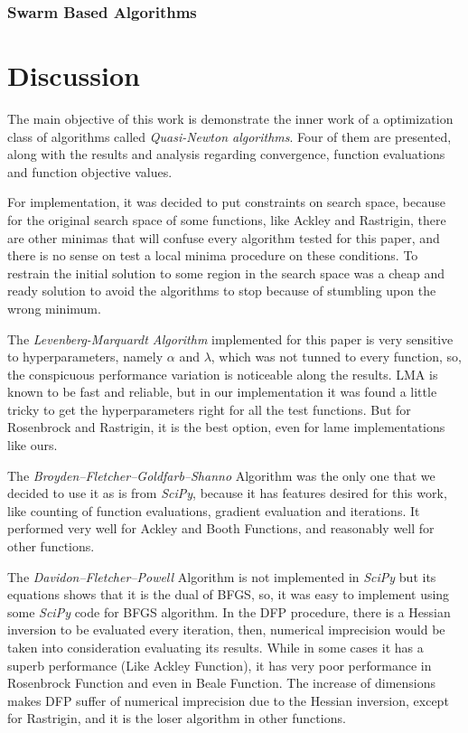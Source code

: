 \documentclass[conference]{IEEEtran}
\begin{document}
\subsubsection{Swarm Based Algorithms}

\label{subsubsec:pressure_vessel_problem_swarm_based}



\section{Discussion}

The main objective of this work is demonstrate the inner work of a optimization class of algorithms called \textit{Quasi-Newton algorithms}. Four of them are presented, along with the results and analysis regarding convergence, function evaluations and function objective values.

For implementation, it was decided to put constraints on search space, because for the original search space of some functions, like Ackley and Rastrigin, there are other minimas that will confuse every algorithm tested for this paper, and there is no sense on test a local minima procedure on these conditions. To restrain the initial solution to some region in the search space was a cheap and ready solution to avoid the algorithms to stop because of stumbling upon the wrong minimum.


The \textit{Levenberg-Marquardt Algorithm} implemented for this paper is very sensitive to hyperparameters, namely $\alpha$ and $\lambda$, which was not tunned to every function, so, the conspicuous performance variation is noticeable along the results. LMA is known to be fast and reliable, but in our implementation it was found a little tricky to get the hyperparameters right for all the test functions. But for Rosenbrock and Rastrigin, it is the best option, even for lame implementations like ours.

The \textit{Broyden–Fletcher–Goldfarb–Shanno} Algorithm was the only one that we decided to use it as is from \textit{SciPy}, because it has features desired for this work, like counting of function evaluations, gradient evaluation and iterations. It performed very well for Ackley and Booth Functions, and reasonably well for other functions.

The \textit{Davidon–Fletcher–Powell} Algorithm is not implemented in \textit{SciPy} but its equations shows that it is the dual of BFGS, so, it was easy to implement using some \textit{SciPy} code for BFGS algorithm. In the DFP procedure, there is a Hessian inversion to be evaluated every iteration, then, numerical imprecision would be taken into consideration evaluating its results. While in some cases it has a superb performance (Like Ackley Function), it has very poor performance in Rosenbrock Function and even in Beale Function. The increase of dimensions makes DFP suffer of numerical imprecision due to the Hessian inversion, except for Rastrigin, and it is the loser algorithm in other functions.
\end{document}
